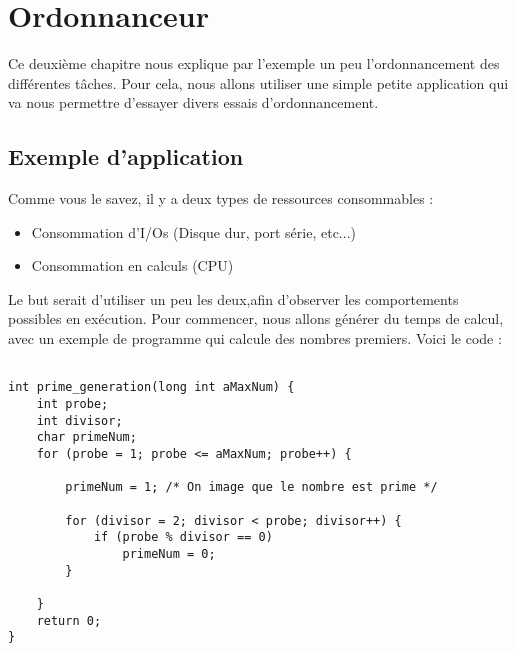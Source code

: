 
\chapter{Ordonnanceur} %

\label{Chapitre 3} %


Ce deuxième chapitre nous explique par l'exemple un peu l'ordonnancement des différentes tâches. Pour cela, nous allons utiliser une simple petite application qui va nous permettre d'essayer divers essais d'ordonnancement.

\section{Exemple d'application}

Comme vous le savez, il y a deux types de ressources consommables :
\begin{itemize}
\item Consommation d'I/Os (Disque dur, port série, etc...)
\item Consommation en calculs (CPU)
\end{itemize}

Le but serait d'utiliser un peu les deux,afin d'observer les comportements possibles en exécution. Pour commencer, nous allons générer du temps de calcul, avec un exemple de programme qui calcule des nombres premiers. Voici le code :

\begin{lstlisting}[frame=single,style=C]  % Start your code-block

int prime_generation(long int aMaxNum) {
	int probe;
	int divisor;
	char primeNum;
	for (probe = 1; probe <= aMaxNum; probe++) {

		primeNum = 1; /* On image que le nombre est prime */

		for (divisor = 2; divisor < probe; divisor++) {
			if (probe % divisor == 0)
				primeNum = 0;
		}

	}
	return 0;
}
\end{lstlisting}


